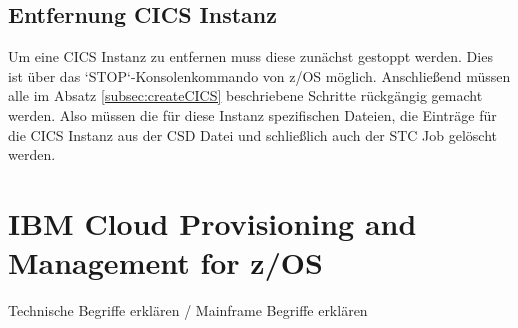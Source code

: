 \subsection{Entfernung CICS Instanz}
Um eine CICS Instanz zu entfernen muss diese zunächst gestoppt werden.
Dies ist über das `STOP`-Konsolenkommando von z/OS möglich.
Anschließend müssen alle im Absatz \ref{subsec:createCICS} beschriebene Schritte rückgängig gemacht werden.
Also müssen die für diese Instanz spezifischen Dateien, die Einträge für die CICS Instanz aus der CSD Datei und schließlich auch der STC Job gelöscht werden.

\section{IBM Cloud Provisioning and Management for z/OS}\label{sec:zosmf}

Technische Begriffe erklären / Mainframe Begriffe erklären

